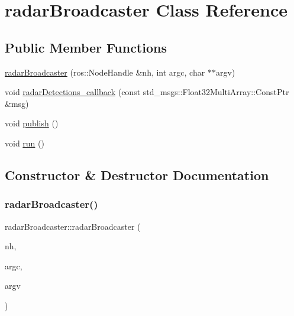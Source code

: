 \hypertarget{classradarBroadcaster}{}\section{radar\+Broadcaster Class Reference}
\label{classradarBroadcaster}
\subsection*{Public Member Functions}
\begin{DoxyCompactItemize}
\item 
\hyperlink{classradarBroadcaster_afe1a20e2bb1b9fcc0dd74c54a459bd1f}{radar\+Broadcaster} (ros\+::\+Node\+Handle \&nh, int argc, char $\ast$$\ast$argv)
\item 
void \hyperlink{classradarBroadcaster_a7971bbf8d590871d0e45758dbbdf79ec}{radar\+Detections\+\_\+callback} (const std\+\_\+msgs\+::\+Float32\+Multi\+Array\+::\+Const\+Ptr \&msg)
\item 
void \hyperlink{classradarBroadcaster_a6e56183ce61a56dba2b2c7d31fdb27ee}{publish} ()
\item 
void \hyperlink{classradarBroadcaster_a5e817100d320a27dfbadb478487e1e79}{run} ()
\end{DoxyCompactItemize}


\subsection{Constructor \& Destructor Documentation}
\mbox{\label{classradarBroadcaster_afe1a20e2bb1b9fcc0dd74c54a459bd1f}} 
\subsubsection{\texorpdfstring{radar\+Broadcaster()}{radarBroadcaster()}}
{\footnotesize\ttfamily radar\+Broadcaster\+::radar\+Broadcaster (\begin{DoxyParamCaption}\item[{ros\+::\+Node\+Handle \&}]{nh,  }\item[{int}]{argc,  }\item[{char $\ast$$\ast$}]{argv }\end{DoxyParamCaption})\hspace{0.3cm}{\ttfamily [inline]}}



